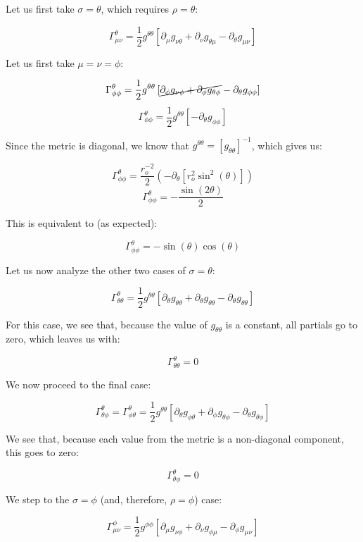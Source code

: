 \begin{enumerate}
\begin{enumerate}
        Let us first take $\sigma=\theta$, which requires $\rho=\theta$:

        $$\Gamma^{\theta}_{\mu\nu}=\frac{1}{2}g^{\theta\theta}\left[ \partial_{\mu}g_{\nu\theta}+\partial_{\nu}g_{\theta\mu}-\partial_{\theta}g_{\mu\nu} \right]$$

        Let us first take $\mu=\nu=\phi$:

        $$\Gamma^{\theta}_{\phi\phi}=\frac{1}{2}g^{\theta\theta}\left[ \cancel{\partial_{\phi}g_{\nu\phi}+\partial_{\phi}g_{\theta\phi}}-\partial_{\theta}g_{\phi\phi} \right]$$
        $$\Gamma^{\theta}_{\phi\phi}=\frac{1}{2}g^{\theta\theta}\left[ -\partial_{\theta}g_{\phi\phi} \right]$$

        Since the metric is diagonal, we know that $g^{\theta\theta}=[g_{\theta\theta}]^{-1}$, which gives us:

        $$\Gamma^{\theta}_{\phi\phi}=\frac{r_o^{-2}}{2} \left(-\partial_{\theta}[r_o^2\sin^2(\theta)]\right)$$
        $$\Gamma^{\theta}_{\phi\phi}=-\frac{\sin(2\theta)}{2}$$

        This is equivalent to (as expected):

        $$\boxed{\Gamma^{\theta}_{\phi\phi}=-\sin(\theta)\cos(\theta)}$$

        Let us now analyze the other two cases of $\sigma=\theta$:

        $$\Gamma^{\theta}_{\theta\theta}=\frac{1}{2}g^{\theta\theta}\left[ \partial_{\theta}g_{\theta\theta}+\partial_{\theta}g_{\theta\theta}-\partial_{\theta}g_{\theta\theta} \right]$$

        For this case, we see that, because the value of $g_{\theta\theta}$ is a constant, all partials go to zero, which leaves us with:

        $$\boxed{\Gamma^{\theta}_{\theta\theta}=0}$$

        We now proceed to the final case:

        $$\Gamma^{\theta}_{\theta\phi}=\Gamma^{\theta}_{\phi\theta}=\frac{1}{2}g^{\theta\theta}\left[ \partial_{\theta}g_{\phi\theta}+\partial_{\phi}g_{\theta\phi}-\partial_{\theta}g_{\theta\phi} \right]$$

        We see that, because each value from the metric is a non-diagonal component, this goes to zero:

        $$\boxed{\Gamma^{\theta}_{\theta\phi}=0}$$

        We step to the $\sigma=\phi$ (and, therefore, $\rho=\phi$) case:

        $$\Gamma^{\phi}_{\mu\nu}=\frac{1}{2}g^{\phi\phi}\left[ \partial_{\mu}g_{\nu\phi}+\partial_{\nu}g_{\phi\mu}-\partial_{\phi}g_{\mu\nu} \right]$$


\end{enumerate}
\end{enumerate}
